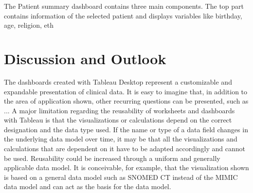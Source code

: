 \documentclass[aac,crcready]{iosart2x}
\begin{document}
The Patient summary dashboard contains three main components. The top part contains information of the selected patient and displays variables like birthday, age, religion, eth

\section{Discussion and Outlook}\label{s5}
The dashboards created with Tableau Desktop represent a customizable and expandable presentation of clinical data. It is easy to imagine that, in addition to the area of application shown, other recurring questions can be presented, such as ...
A major limitation regarding the reusability of worksheets and dashboards with Tableau is that the visualizations or calculations depend on the correct designation and the data type used. If the name or type of a data field changes in the underlying data model over time, it may be that all the visualizations and calculations that are dependent on it have to be adapted accordingly and cannot be used. Reusability could be increased through a uniform and generally applicable data model. It is conceivable, for example, that the visualization shown is based on a general data model such as SNOMED CT instead of the MIMIC data model and can act as the basis for the data model.



\end{document}
